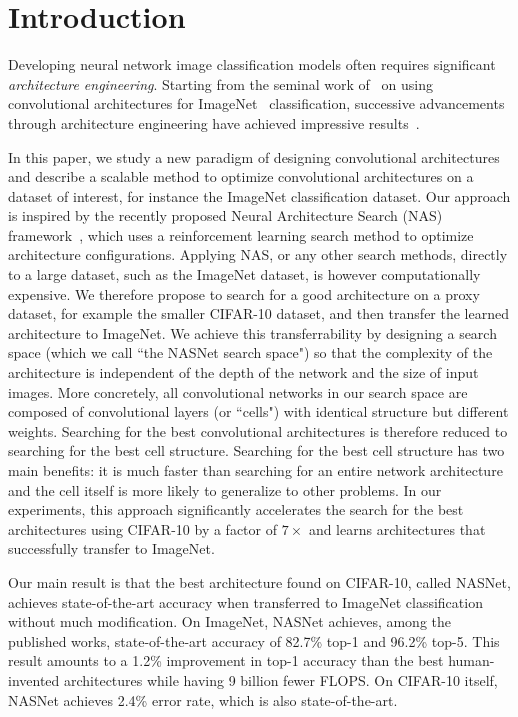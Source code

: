 \documentclass[10pt,twocolumn,letterpaper]{article}
\begin{document}
\section{Introduction}

Developing neural network image classification models often requires significant \emph{architecture engineering}. Starting from the seminal work of~\cite{krizhevsky2012imagenet} on using convolutional architectures \cite{fukushima1982neocognitron,lecun1998gradient} for ImageNet~\cite{deng2009imagenet} classification, successive advancements through architecture engineering have achieved impressive results~\cite{simonyan2014very,szegedy2015going,he2015deep,szegedy2016rethinking,szegedy2016inception,xie2016aggregated}. 


In this paper, we study a new paradigm of designing convolutional architectures and describe a scalable method to optimize convolutional architectures on a dataset of interest, for instance the ImageNet classification dataset. 
Our approach is inspired by the recently proposed Neural Architecture Search (NAS) framework~\cite{zoph2017neural}, which uses a reinforcement learning search method to optimize architecture configurations. Applying NAS, or any other search methods, directly to a large dataset, such as the ImageNet dataset, is however computationally expensive. We therefore propose to search for a good architecture on a proxy dataset, for example the smaller CIFAR-10 dataset, and then transfer the learned architecture to ImageNet. We achieve this transferrability by designing a search space (which we call ``the NASNet search space") so that the complexity of the architecture is independent of the depth of the network and the size of input images. More concretely, all convolutional networks in our search space are composed of convolutional layers (or ``cells") with identical structure but different weights. Searching for the best convolutional architectures is therefore reduced to searching for the best cell structure. Searching for the best cell structure has two main benefits: it is much faster than searching for an entire network architecture and the cell itself is more likely to generalize to other problems. 
In our experiments, this approach significantly accelerates the search for the best architectures using CIFAR-10 by a factor of $7\times$ and learns architectures that successfully transfer to ImageNet.


Our main result is that the best architecture found on CIFAR-10, called NASNet,
achieves state-of-the-art accuracy when transferred to ImageNet classification without much modification. On ImageNet, NASNet achieves, among the published works, state-of-the-art accuracy of 82.7\% top-1 and 96.2\% top-5. This result amounts to a 1.2\% improvement in top-1 accuracy than the best human-invented architectures while having 9 billion fewer FLOPS. On CIFAR-10 itself, NASNet achieves 2.4\% error rate, which is also state-of-the-art.
\end{document}
